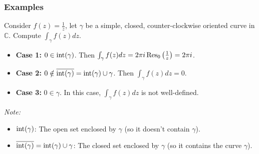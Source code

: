 \subsubsection{Examples}

\begin{example}[Example 1]
Consider $f(z) = \frac{1}{z}$, let $\gamma$ be a simple, closed, counter-clockwise oriented curve in $\mathbb{C}$. Compute $\int_\gamma f(z) dz$.

\begin{itemize}
    \item \textbf{Case 1:} $0 \in \operatorname{int}(\gamma)$. Then $\int_\gamma f(z) dz = 2\pi i \operatorname{Res}_0\left(\frac{1}{z}\right) = 2\pi i$.
    \item \textbf{Case 2:} $0 \notin \overline{\operatorname{int}(\gamma)} = \operatorname{int}(\gamma) \cup \gamma$. Then $\int_\gamma f(z) dz = 0$.
    \item \textbf{Case 3:} $0 \in \gamma$. In this case, $\int_\gamma f(z) dz$ is not well-defined.
\end{itemize}

\textit{Note:} 
\begin{itemize}
    \item $\operatorname{int}(\gamma)$: The open set enclosed by $\gamma$ (so it doesn't contain $\gamma$).
    \item $\overline{\operatorname{int}(\gamma)} = \operatorname{int}(\gamma) \cup \gamma$: The closed set enclosed by $\gamma$ (so it contains the curve $\gamma$).
\end{itemize}
\end{example}

